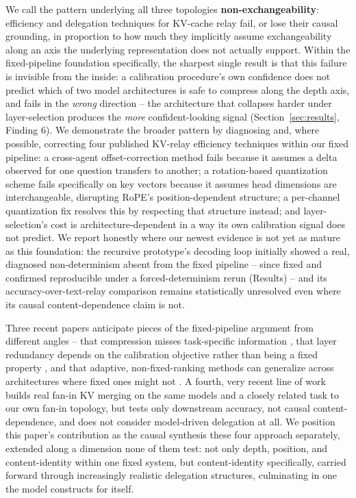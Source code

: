 \documentclass[11pt]{article}
\begin{document}
We call the pattern underlying all three topologies
\textbf{non-exchangeability}: efficiency and delegation techniques for
KV-cache relay fail, or lose their causal grounding, in proportion to how
much they implicitly assume exchangeability along an axis the underlying
representation does not actually support. Within the fixed-pipeline
foundation specifically, the sharpest single result is that this failure
is invisible from the inside: a calibration procedure's own confidence
does not predict which of two model architectures is safe to compress
along the depth axis, and fails in the \emph{wrong} direction -- the
architecture that collapses harder under layer-selection produces the
\emph{more} confident-looking signal (Section~\ref{sec:results}, Finding
6). We demonstrate the broader pattern by diagnosing and, where possible,
correcting four published KV-relay efficiency techniques within our
fixed pipeline: a cross-agent offset-correction method \citep{kvcomm2025}
fails because it assumes a delta observed for one question transfers to
another; a rotation-based quantization scheme
\citep{turboquant2026,polarquant2026} fails specifically on key vectors
because it assumes head dimensions are interchangeable, disrupting RoPE's
position-dependent structure; a per-channel quantization fix
\citep{kivi2024} resolves this by respecting that structure instead; and
layer-selection's cost is architecture-dependent in a way its own
calibration signal does not predict. We report honestly where our
newest evidence is not yet as mature as this foundation: the recursive
prototype's decoding loop initially showed a real, diagnosed
non-determinism absent from the fixed pipeline -- since fixed and
confirmed reproducible under a forced-determinism rerun (Results) -- and
its accuracy-over-text-relay comparison remains statistically unresolved
even where its causal content-dependence claim is not.

Three recent papers anticipate pieces of the fixed-pipeline argument from
different angles -- that compression misses task-specific information
\citep{pitfallskv2026}, that layer redundancy depends on the calibration
objective rather than being a fixed property \citep{rethinkredundancy2026},
and that adaptive, non-fixed-ranking methods can generalize across
architectures where fixed ones might not \citep{adak2026}. A fourth,
very recent line of work \citep{canonicalmerge2026} builds real fan-in KV
merging on the same models and a closely related task to our own fan-in
topology, but tests only downstream accuracy, not causal
content-dependence, and does not consider model-driven delegation at
all. We position this paper's contribution as the causal synthesis these
four approach separately, extended along a dimension none of them test:
not only depth, position, and content-identity within one fixed system,
but content-identity specifically, carried forward through increasingly
realistic delegation structures, culminating in one the model
constructs for itself.
\end{document}
